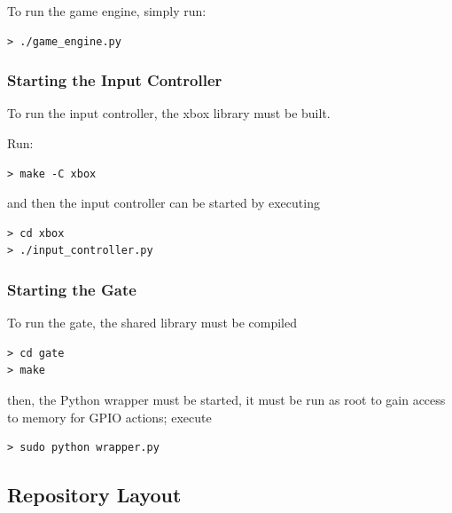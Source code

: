 \documentclass[letterpaper,fleqn]{article}
\begin{document}
To run the game engine, simply run:

\begin{lstlisting}
> ./game_engine.py
\end{lstlisting}

\subsubsection{Starting the Input Controller}

To run the input controller, the xbox library must be built.

Run:

\begin{lstlisting}
> make -C xbox
\end{lstlisting}

and then the input controller can be started by executing

\begin{lstlisting}
> cd xbox
> ./input_controller.py
\end{lstlisting}

\subsubsection{Starting the Gate}
To run the gate, the shared library must be compiled

\begin{lstlisting}
> cd gate
> make
\end{lstlisting}

then, the Python wrapper must be started, it must be run as root to gain access to memory for GPIO actions; execute

\begin{lstlisting}
> sudo python wrapper.py
\end{lstlisting}

\subsection{Repository Layout}
\end{document}

